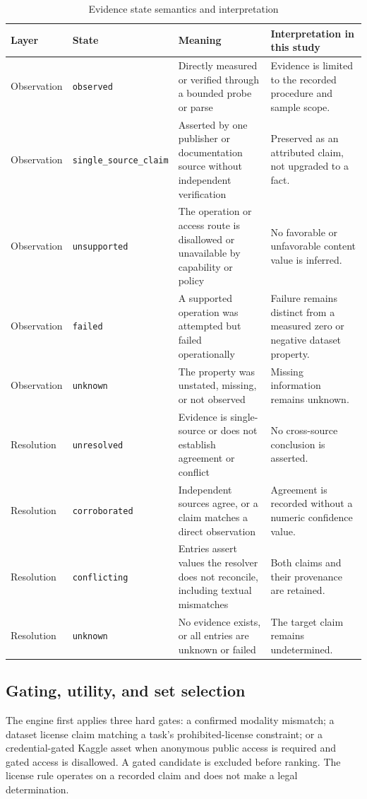 \documentclass[conference]{IEEEtran}
\begin{document}
\begin{table}[!t]
\caption{Evidence state semantics and interpretation}
\label{tab:evidence-states}
\centering
\footnotesize
\begin{tabularx}{\textwidth}{p{0.86in}p{1.48in}X p{2.0in}}
\toprule
Layer & State & Meaning & Interpretation in this study\\
\midrule
Observation & \texttt{observed} & Directly measured or verified through a bounded probe or parse & Evidence is limited to the recorded procedure and sample scope.\\
Observation & \texttt{single\_source\_claim} & Asserted by one publisher or documentation source without independent verification & Preserved as an attributed claim, not upgraded to a fact.\\
Observation & \texttt{unsupported} & The operation or access route is disallowed or unavailable by capability or policy & No favorable or unfavorable content value is inferred.\\
Observation & \texttt{failed} & A supported operation was attempted but failed operationally & Failure remains distinct from a measured zero or negative dataset property.\\
Observation & \texttt{unknown} & The property was unstated, missing, or not observed & Missing information remains unknown.\\
Resolution & \texttt{unresolved} & Evidence is single-source or does not establish agreement or conflict & No cross-source conclusion is asserted.\\
Resolution & \texttt{corroborated} & Independent sources agree, or a claim matches a direct observation & Agreement is recorded without a numeric confidence value.\\
Resolution & \texttt{conflicting} & Entries assert values the resolver does not reconcile, including textual mismatches & Both claims and their provenance are retained.\\
Resolution & \texttt{unknown} & No evidence exists, or all entries are unknown or failed & The target claim remains undetermined.\\
\bottomrule
\end{tabularx}
\end{table}

\subsection{Gating, utility, and set selection}
The engine first applies three hard gates: a confirmed modality mismatch; a dataset license claim matching a task's prohibited-license constraint; or a credential-gated Kaggle asset when anonymous public access is required and gated access is disallowed. A gated candidate is excluded before ranking. The license rule operates on a recorded claim and does not make a legal determination.
\end{document}
